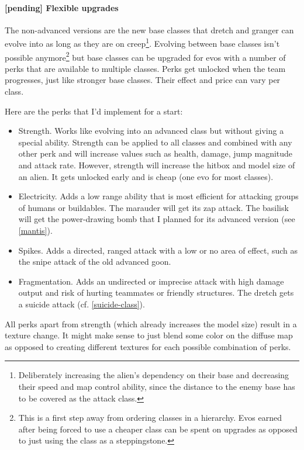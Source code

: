 \documentclass{scrartcl}
\newcommand{\pending}  [0]{\textcolor{pending}  {\textbf{[pending] }}}
\begin{document}
\paragraph{\pending Flexible upgrades}
\label{flexible-upgrades}

The non-advanced versions are the new base classes that dretch and granger can evolve into as long as they are on creep\footnote{Deliberately increasing the alien's dependency on their base and decreasing their speed and map control ability, since the distance to the enemy base has to be covered as the attack class.}. Evolving between base classes isn't possible anymore\footnote{This is a first step away from ordering classes in a hierarchy. Evos earned after being forced to use a cheaper class can be spent on upgrades as opposed to just using the class as a steppingstone.} but base classes can be upgraded for evos with a number of perks that are available to multiple classes. Perks get unlocked when the team progresses, just like stronger base classes. Their effect and price can vary per class.

Here are the perks that I'd implement for a start:

\begin{itemize}
\item Strength. Works like evolving into an advanced class but without giving a special ability. Strength can be applied to all classes and combined with any other perk and will increase values such as health, damage, jump magnitude and attack rate. However, strength will increase the hitbox and model size of an alien. It gets unlocked early and is cheap (one evo for most classes).
\item Electricity. Adds a low range ability that is most efficient for attacking groups of humans or buildables. The marauder will get its zap attack. The basilisk will get the power-drawing bomb that I planned for its advanced version (see \ref{mantis}).
\item Spikes. Adds a directed, ranged attack with a low or no area of effect, such as the snipe attack of the old advanced goon.
\item Fragmentation. Adds an undirected or imprecise attack with high damage output and risk of hurting teammates or friendly structures. The dretch gets a suicide attack (cf. \ref{suicide-class}).
\end{itemize}

All perks apart from strength (which already increases the model size) result in a texture change. It might make sense to just blend some color on the diffuse map as opposed to creating different textures for each possible combination of perks.
\end{document}
